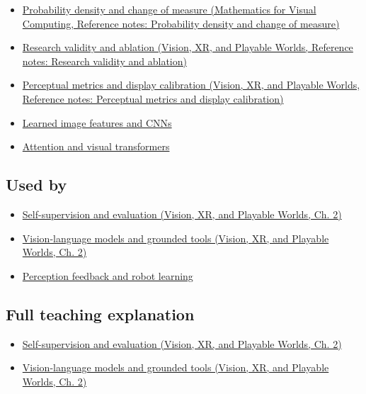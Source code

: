 \begin{itemize}
\tightlist
\item
  \href{../02-Mathematics-for-Visual-Computing/main.pdf\#nameddest=appendix-4815cd87ab8b}{Probability density and change of measure (Mathematics for Visual Computing, Reference notes: Probability density and change of measure)}
\item
  \href{../07-Vision-XR-and-Playable-Worlds/main.pdf\#nameddest=appendix-65788587ef78}{Research validity and ablation (Vision, XR, and Playable Worlds, Reference notes: Research validity and ablation)}
\item
  \href{../07-Vision-XR-and-Playable-Worlds/main.pdf\#nameddest=appendix-b2c1846508bf}{Perceptual metrics and display calibration (Vision, XR, and Playable Worlds, Reference notes: Perceptual metrics and display calibration)}
\item
  \hyperref[appendix-47c51ea026fb]{Learned image features and CNNs}
\item
  \hyperref[appendix-a9d5dfdd164a]{Attention and visual transformers}
\end{itemize}

\subsection{Used by}\label{appendix-772f1fd96148-used-by}

\begin{itemize}
\tightlist
\item
  \href{../07-Vision-XR-and-Playable-Worlds/main.pdf\#nameddest=04-visual-computing-ii-ch031-self-supervision-and-evaluation}{Self-supervision and evaluation (Vision, XR, and Playable Worlds, Ch. 2)}
\item
  \href{../07-Vision-XR-and-Playable-Worlds/main.pdf\#nameddest=04-visual-computing-ii-ch031-vision-language-models-and-grounded-tools}{Vision-language models and grounded tools (Vision, XR, and Playable Worlds, Ch. 2)}
\item
  \hyperref[appendix-b0c42da325f1]{Perception feedback and robot learning}
\end{itemize}

\subsection{Full teaching explanation}\label{appendix-772f1fd96148-full-teaching-explanation}

\begin{itemize}
\tightlist
\item
  \href{../07-Vision-XR-and-Playable-Worlds/main.pdf\#nameddest=04-visual-computing-ii-ch031-self-supervision-and-evaluation}{Self-supervision and evaluation (Vision, XR, and Playable Worlds, Ch. 2)}
\item
  \href{../07-Vision-XR-and-Playable-Worlds/main.pdf\#nameddest=04-visual-computing-ii-ch031-vision-language-models-and-grounded-tools}{Vision-language models and grounded tools (Vision, XR, and Playable Worlds, Ch. 2)}
\end{itemize}

